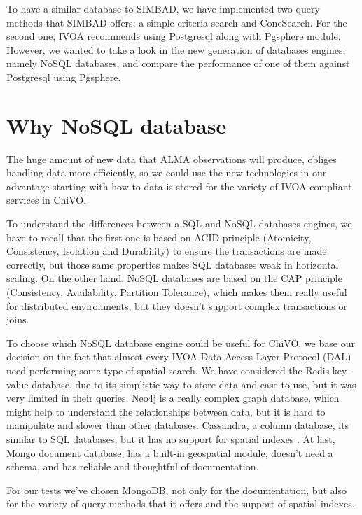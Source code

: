 \documentclass[11pt,twoside]{article}
\begin{document}
To have a similar database to SIMBAD, we have implemented two query methods that
SIMBAD offers: a simple criteria search and ConeSearch. For the second one, 
IVOA recommends using Postgresql along with Pgsphere module. 
However, we wanted to take a look in the new generation of databases engines, namely NoSQL databases, and compare the
performance of one of them against Postgresql using Pgsphere.


\section{Why NoSQL database}
    The huge amount of new data that ALMA observations will produce, obliges
    handling data more efficiently, so we could use the new technologies 
    in our advantage starting with how to data is stored for the variety
    of IVOA compliant services in ChiVO.
    
    To understand the differences between a SQL and NoSQL databases engines, we have
    to recall that the first one is based on ACID principle 
    (Atomicity, Consistency, Isolation and Durability) to ensure the
    transactions are made correctly, but those same properties
    makes SQL databases weak in horizontal scaling. On the other hand, NoSQL
    databases are based on the CAP principle (Consistency, Availability, Partition
    Tolerance), which makes them really useful for distributed environments, but 
    they doesn't support complex transactions or joins.

    To choose which NoSQL database engine could be useful for ChiVO, we base our
    decision on the fact that almost every
    IVOA Data Access Layer Protocol (DAL) need performing some type of spatial
    search. We have considered the Redis key-value database, due to its
    simplistic way to store data and ease to use, but it was very limited in
    their queries. Neo4j is a really complex graph database, which might help to
    understand the relationships between data, but it is hard to manipulate and slower 
    than other databases. Cassandra, a column database, its similar
    to SQL databases, but it has no support for spatial indexes %
    . At last, Mongo document database, 
    has a built-in geospatial module, doesn't need a schema, and has reliable
    and thoughtful of documentation.

    For our tests we've chosen MongoDB, not only for the documentation, but also
    for the variety of query methods that it offers and the support of spatial indexes.
\end{document}
